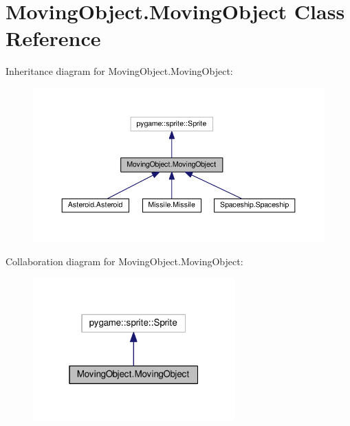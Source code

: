 \hypertarget{classMovingObject_1_1MovingObject}{}\section{Moving\+Object.\+Moving\+Object Class Reference}
\label{classMovingObject_1_1MovingObject}


Inheritance diagram for Moving\+Object.\+Moving\+Object\+:
\nopagebreak
\begin{figure}[H]
\begin{center}
\leavevmode
\includegraphics[width=350pt]{classMovingObject_1_1MovingObject__inherit__graph}
\end{center}
\end{figure}


Collaboration diagram for Moving\+Object.\+Moving\+Object\+:
\nopagebreak
\begin{figure}[H]
\begin{center}
\leavevmode
\includegraphics[width=220pt]{classMovingObject_1_1MovingObject__coll__graph}
\end{center}
\end{figure}
